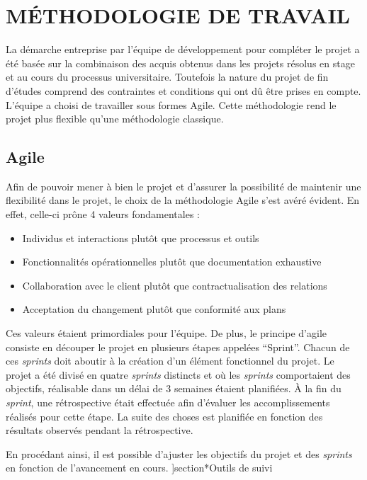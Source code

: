 \documentclass[rapport.tex]{subfiles}
\begin{document}
\chapter*{\uppercase{Méthodologie de travail}}
La démarche entreprise par l’équipe de développement pour compléter le projet a été basée sur la combinaison des acquis obtenus dans les projets résolus en stage et au cours du processus universitaire. Toutefois la nature du projet de fin d’études comprend des contraintes et conditions qui ont dû être prises en compte. L’équipe a choisi de travailler sous formes Agile. Cette méthodologie rend le projet plus flexible qu’une méthodologie classique.
\section*{Agile}
Afin de pouvoir mener à bien le projet et d’assurer la possibilité de maintenir une flexibilité dans le projet, le choix de la méthodologie Agile s’est avéré évident. En effet, celle-ci prône 4 valeurs fondamentales \citep*{agile}:
\begin{itemize}
\item {Individus et interactions plutôt que processus et outils}
\item {Fonctionnalités opérationnelles plutôt que documentation exhaustive}
\item {Collaboration avec le client plutôt que contractualisation des relations}
\item{Acceptation du changement plutôt que conformité aux plans}
\end{itemize}
Ces valeurs étaient primordiales pour l’équipe. De plus, le principe d’agile consiste en découper le projet en plusieurs étapes appelées “Sprint”. Chacun de ces \textit{sprints} doit aboutir à la création d’un élément fonctionnel du projet. Le projet a été divisé en quatre \textit{sprints} distincts et où les \textit{sprints} comportaient des objectifs, réalisable dans un délai de 3 semaines étaient planifiées. À la fin du \textit{sprint}, une rétrospective était effectuée afin d’évaluer les accomplissements réalisés pour cette étape. La suite des choses est planifiée en fonction des résultats observés pendant la rétrospective.
\par
En procédant ainsi, il est possible d’ajuster les objectifs du projet et des \textit{sprints} en fonction de l’avancement en cours.
]section*{Outils de suivi}
\end{document}
